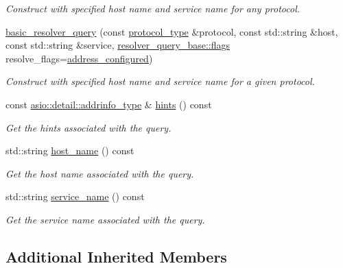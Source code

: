 \begin{DoxyCompactItemize}
\begin{DoxyCompactList}\small\item\em Construct with specified host name and service name for any protocol. \end{DoxyCompactList}\item 
\hyperlink{classasio_1_1ip_1_1basic__resolver__query_a328a1edf40fdd0595ff045e2e7e55ad3}{basic\+\_\+resolver\+\_\+query} (const \hyperlink{classasio_1_1ip_1_1basic__resolver__query_afc47f8001caf9274f6f567ae541e224a}{protocol\+\_\+type} \&protocol, const std\+::string \&host, const std\+::string \&service, \hyperlink{classasio_1_1ip_1_1resolver__query__base_a458691242de07dc542fd9834f7b15cfe}{resolver\+\_\+query\+\_\+base\+::flags} resolve\+\_\+flags=\hyperlink{classasio_1_1ip_1_1resolver__query__base_a458691242de07dc542fd9834f7b15cfea72387a0c1a4eec494d376e28fefa7b8d}{address\+\_\+configured})
\begin{DoxyCompactList}\small\item\em Construct with specified host name and service name for a given protocol. \end{DoxyCompactList}\item 
const \hyperlink{namespaceasio_1_1detail_ad8df56a17e3aa9ce2ad251fb76426e67}{asio\+::detail\+::addrinfo\+\_\+type} \& \hyperlink{classasio_1_1ip_1_1basic__resolver__query_afe49f3f80df1085c6126264c59a717be}{hints} () const 
\begin{DoxyCompactList}\small\item\em Get the hints associated with the query. \end{DoxyCompactList}\item 
std\+::string \hyperlink{classasio_1_1ip_1_1basic__resolver__query_a70325245c88e41fece8d50e959cf10df}{host\+\_\+name} () const 
\begin{DoxyCompactList}\small\item\em Get the host name associated with the query. \end{DoxyCompactList}\item 
std\+::string \hyperlink{classasio_1_1ip_1_1basic__resolver__query_a8546eb4b23a8dc1c9f0d6efb871b748f}{service\+\_\+name} () const 
\begin{DoxyCompactList}\small\item\em Get the service name associated with the query. \end{DoxyCompactList}\end{DoxyCompactItemize}
\subsection*{Additional Inherited Members}


